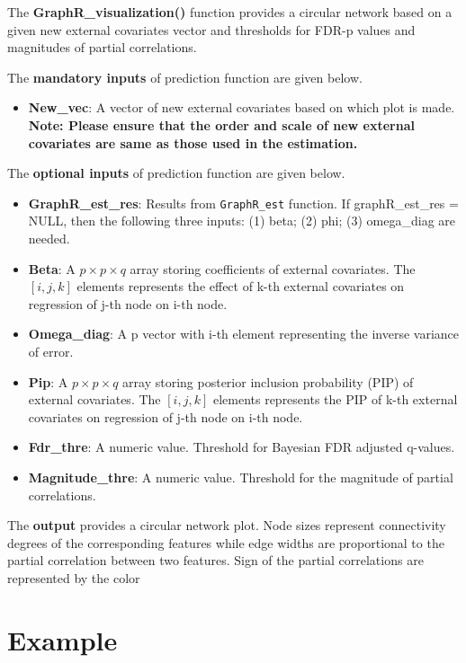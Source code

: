 \documentclass[
]{book}
\providecommand{\tightlist}{%
  \setlength{\itemsep}{0pt}\setlength{\parskip}{0pt}}
\begin{document}
The \textbf{GraphR\_visualization()} function provides a circular network based on
a given new external covariates vector and thresholds for FDR-p values and magnitudes of partial correlations.

The \textbf{mandatory inputs} of prediction function are given below.

\begin{itemize}
\tightlist
\item
  \textbf{New\_vec}: A vector of new external covariates based on which plot is made. \textbf{Note: Please ensure that the order and scale of new external covariates are same as those used in the estimation.}
\end{itemize}

The \textbf{optional inputs} of prediction function are given below.

\begin{itemize}
\item
  \textbf{GraphR\_est\_res}: Results from \texttt{GraphR\_est} function. If graphR\_est\_res = NULL, then the following three inputs: (1) beta; (2) phi; (3) omega\_diag are needed.
\item
  \textbf{Beta}: A \(p \times p \times q\) array storing coefficients of external covariates. The \([i,j,k]\) elements represents the effect of k-th external covariates on regression of j-th node on i-th node.
\item
  \textbf{Omega\_diag}: A p vector with i-th element representing the inverse variance of error.
\item
  \textbf{Pip}: A \(p \times p \times q\) array storing posterior inclusion probability (PIP) of external covariates. The \([i,j,k]\) elements represents the PIP of k-th external covariates on regression of j-th node on i-th node.
\item
  \textbf{Fdr\_thre}: A numeric value. Threshold for Bayesian FDR adjusted q-values.
\item
  \textbf{Magnitude\_thre}: A numeric value. Threshold for the magnitude of partial correlations.
\end{itemize}

The \textbf{output} provides a circular network plot. Node sizes represent connectivity degrees
of the corresponding features while edge widths are proportional to the partial
correlation between two features. Sign of the partial correlations are represented
by the color

\hypertarget{example}{%
\section{Example}\label{example}}
\end{document}
